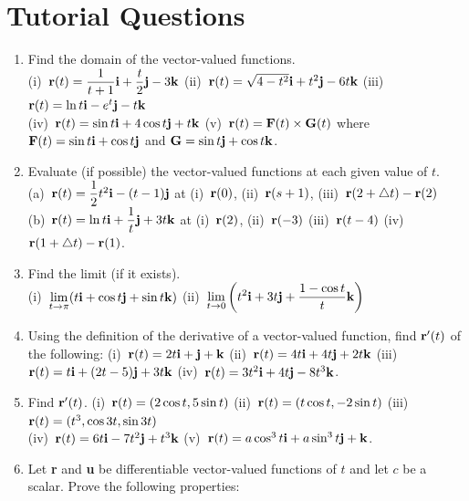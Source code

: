 \documentclass[titlepage,a4paper,12pt]{report}
\begin{document}
\section{Tutorial Questions}
\begin{enumerate}
\item Find the domain of the vector-valued functions.\\
(i)\, ${\bf{r}}(t)=\dfrac{1}{t+1}{\bf{i}}+\dfrac{t}{2}{\bf{j}}-3{\bf{k}}$ \quad (ii)\, ${\bf{r}}(t)=\sqrt{4-t^2}{\bf{i}} +t^2{\bf{j}}-6t{\bf{k}}$ \quad (iii)\, ${\bf{r}}(t)=\ln t {\bf{i}}-e^t{\bf{j}}-t{\bf{k}}$\\
(iv)\, ${\bf{r}}(t)=\sin t {\bf{i}}+4\cos t {\bf{j}}+t{\bf{k}}$ \quad (v)\, ${\bf{r}}(t)={\bf{F}}(t) \times {\bf{G}}(t)$ where ${\bf{F}}(t)=\sin t {\bf{i}}+\cos t {\bf{j}}$ and $ {\bf{G}}=\sin t {\bf{j}}+\cos t {\bf{k}}$.
\item Evaluate (if possible) the vector-valued functions at each given value of $t$.\\
(a)\, ${\bf{r}}(t)=\dfrac{1}{2}t^2{\bf{i}}-(t-1){\bf{j}}$ at  (i)\, ${\bf{r}}(0)$, (ii)\, ${\bf{r}}(s+1)$, (iii)\, ${\bf{r}}(2+\bigtriangleup t)-{\bf{r}}(2)$\\
(b)\, ${\bf{r}}(t)=\ln t {\bf{i}} +\dfrac{1}{t}{\bf{j}}+3t{\bf{k}}$ at (i)\, ${\bf{r}}(2)$, (ii)\, ${\bf{r}}(-3)$ (iii)\, ${\bf{r}}(t-4)$ (iv)\, ${\bf{r}}(1+\bigtriangleup t)-{\bf{r}}(1)$. 
\item Find the limit (if it exists).\\
(i)\, $\displaystyle \lim _{t\rightarrow \pi} (t{\bf{i}}+\cos t{\bf{j}}+\sin t{\bf{k}})$ \quad (ii)\, $\displaystyle \lim _{t\rightarrow 0}\left(t^2{\bf{i}}+3t{\bf{j}}+\dfrac{1-\cos t}{t}{\bf{k}}\right)$
\item Using the definition of the derivative of a vector-valued function, find ${\bf{r}}'(t)$ of the following:
\quad (i)\, ${\bf{r}}(t)=2t{\bf{i}}+{\bf{j}}+{\bf{k}}$ \quad (ii)\, ${\bf{r}}(t)=4t{\bf{i}}+4t{\bf{j}}+2t{\bf{k}}$ \quad (iii)\, ${\bf{r}}(t)=t{\bf{i}}+(2t-5){\bf{j}}+3t{\bf{k}}$ \quad (iv)\, ${\bf{r}}(t)=3t^2{\bf{i}}+4t{\bf{j}}-8t^3{\bf{k}}$.
\item Find ${\bf{r}}'(t)$. \quad (i)\, ${\bf{r}}(t)=(2\cos t, 5\sin t)$ \quad (ii)\, ${\bf{r}}(t)=(t\cos t, -2\sin t)$ \quad (iii)\, ${\bf{r}}(t)=(t^3, \cos 3t, \sin 3t)$\\
(iv)\, ${\bf{r}}(t)=6t{\bf{i}}-7t^2{\bf{j}}+t^3{\bf{k}}$ \quad (v)\, ${\bf{r}}(t)=a\cos ^3 t{\bf{i}}+a\sin ^3 t{\bf{j}}+{\bf{k}}$.
\item Let \textbf{r} and \textbf{u} be differentiable vector-valued functions of $t$ and let $c$ be a scalar. Prove the following properties:\\

\end{enumerate}
\end{document}
